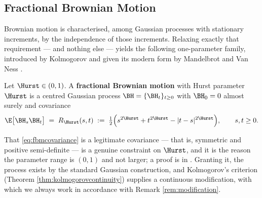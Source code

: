 \subsection{Fractional Brownian Motion}\label{subsec:fbm}

Brownian motion is characterised, among Gaussian processes with stationary increments, by the
independence of those increments. Relaxing exactly that requirement --- and nothing else --- yields
the following one-parameter family, introduced by Kolmogorov and given its modern form by Mandelbrot
and Van Ness \cite{mandelbrotvanness1968}.

\begin{definition}\label{def:fbm}
Let $\Hurst \in (0,1)$. A \textbf{fractional Brownian motion} with Hurst parameter $\Hurst$ is a
centred Gaussian process $\BH = \{\BH_t\}_{t\geq0}$ with $\BH_0 = 0$ almost surely and covariance
\begin{equation}\label{eq:fbmcovariance}
\E\bigl[\BH_s \BH_t\bigr] \;=\; R_\Hurst(s,t) \;:=\; \tfrac12\Bigl( s^{2\Hurst} + t^{2\Hurst} - |t-s|^{2\Hurst} \Bigr),
\qquad s,t \geq 0 .
\end{equation}
\end{definition}

That \eqref{eq:fbmcovariance} is a legitimate covariance --- that is, symmetric and positive
semi-definite --- is a genuine constraint on $\Hurst$, and it is the reason the parameter range is
$(0,1)$ and not larger; a proof is in \cite[Ch.\ 7]{marcusrosen2006}. Granting it, the process
exists by the standard Gaussian construction, and Kolmogorov's criterion (Theorem
\ref{thm:kolmogorovcontinuity}) supplies a continuous modification, with which we always work in
accordance with Remark \ref{rem:modification}.

